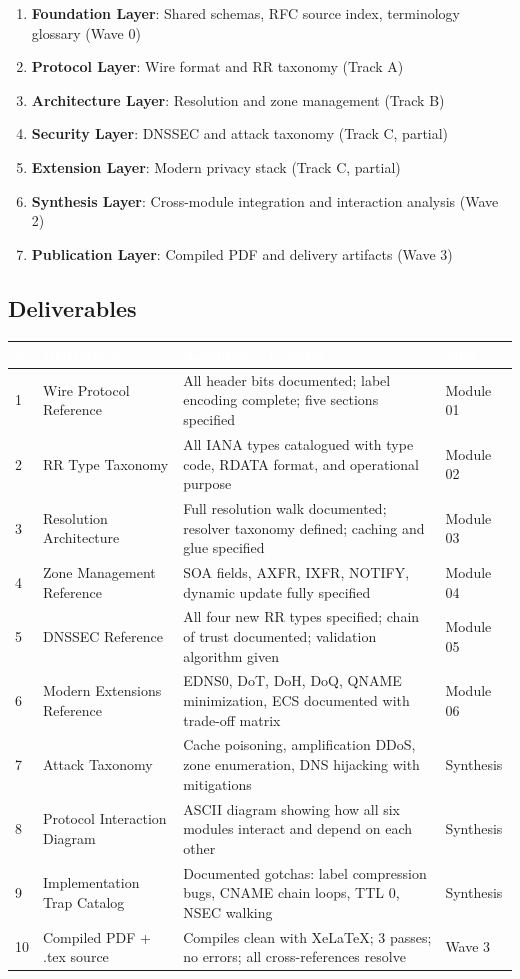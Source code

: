 \documentclass[11pt,letterpaper]{article}
\newcommand{\tableheader}[1]{\textbf{\sffamily\textcolor{white}{#1}}}
\begin{document}
\begin{enumerate}
  \item \textbf{Foundation Layer}: Shared schemas, RFC source index, terminology glossary (Wave 0)
  \item \textbf{Protocol Layer}: Wire format and RR taxonomy (Track A)
  \item \textbf{Architecture Layer}: Resolution and zone management (Track B)
  \item \textbf{Security Layer}: DNSSEC and attack taxonomy (Track C, partial)
  \item \textbf{Extension Layer}: Modern privacy stack (Track C, partial)
  \item \textbf{Synthesis Layer}: Cross-module integration and interaction analysis (Wave 2)
  \item \textbf{Publication Layer}: Compiled PDF and delivery artifacts (Wave 3)
\end{enumerate}

\subsection{Deliverables}

\begin{center}
\begin{tabularx}{\textwidth}{C{0.5cm}L{3.5cm}XL{3cm}}
\toprule
{}
\tableheader{\#} & \tableheader{Deliverable} & \tableheader{Acceptance Criteria} & \tableheader{Spec} \\
 & Wire Protocol Reference & All header bits documented; label encoding complete; five sections specified & Module 01 \\
2 & RR Type Taxonomy & All IANA types catalogued with type code, RDATA format, and operational purpose & Module 02 \\
3 & Resolution Architecture & Full resolution walk documented; resolver taxonomy defined; caching and glue specified & Module 03 \\
4 & Zone Management Reference & SOA fields, AXFR, IXFR, NOTIFY, dynamic update fully specified & Module 04 \\
5 & DNSSEC Reference & All four new RR types specified; chain of trust documented; validation algorithm given & Module 05 \\
6 & Modern Extensions Reference & EDNS0, DoT, DoH, DoQ, QNAME minimization, ECS documented with trade-off matrix & Module 06 \\
7 & Attack Taxonomy & Cache poisoning, amplification DDoS, zone enumeration, DNS hijacking with mitigations & Synthesis \\
8 & Protocol Interaction Diagram & ASCII diagram showing how all six modules interact and depend on each other & Synthesis \\
9 & Implementation Trap Catalog & Documented gotchas: label compression bugs, CNAME chain loops, TTL 0, NSEC walking & Synthesis \\
10 & Compiled PDF + .tex source & Compiles clean with XeLaTeX; 3 passes; no errors; all cross-references resolve & Wave 3 \\
\bottomrule
\end{tabularx}
\end{center}
\end{document}
